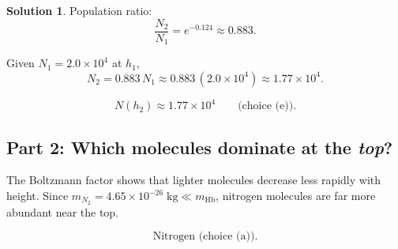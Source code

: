 \documentclass[12pt]{article}
\theoremstyle{definition} %
\newtheorem{solution}{Solution}
\theoremstyle{plain} %
\begin{document}
\begin{solution}
                              Population ratio:
                              \[
                              \frac{N_2}{N_1} = e^{-0.124} \approx 0.883.
                              \]
                              
                              Given \(N_1 = 2.0\times10^{4}\) at \(h_1\),
                              \[
                              N_2 = 0.883\,N_1
                                   \approx 0.883\,(2.0\times10^{4})
                                   \approx 1.77\times10^{4}.
                              \]
                              
                              \[
                              \boxed{N(h_2) \approx 1.77\times10^{4}}
                              \qquad\text{(choice (e)).}
                              \]
                              
                              \subsection*{Part 2: Which molecules dominate at the \emph{top}?}
                              
                              The Boltzmann factor shows that lighter molecules decrease less rapidly with
                              height.  Since
                              \(m_{N_2}=4.65\times10^{-26}\;\text{kg}\ll m_{\mathrm{Hb}}\),
                              nitrogen molecules are far more abundant near the top.
                              
                              \[
                              \boxed{\text{Nitrogen (choice (a)).}}
                              \]
                              \end{solution}
\end{document}

